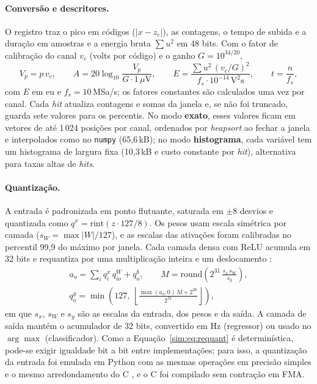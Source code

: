 \paragraph{Conversão e descritores.} O registro traz o pico em códigos (\(|x - z_c|\)), as contagens, o tempo de subida e a duração em amostras e a energia bruta \(\sum u^2\) em 48 bits. Com o fator de calibração do canal \(v_c\) (volts por código) e o ganho \(G = 10^{34/20}\),
\begin{equation}
	V_p = p\, v_c, \qquad
	A = 20 \log_{10}\frac{V_p}{G \cdot 1\,\mu\mathrm{V}}, \qquad
	E = \frac{\sum u^2\, (v_c/G)^2}{f_s \cdot 10^{-14}\,\mathrm{V^2 s}}, \qquad
	t = \frac{n}{f_s},
	\label{sim:eq:conversao}
\end{equation}
com \(E\) em eu e \(f_s = 10\,\)MSa/s; os fatores constantes são calculados uma vez por canal. Cada \textit{hit} atualiza contagens e somas da janela e, se não foi truncado, guarda sete valores para os percentis. No modo \textbf{exato}, esses valores ficam em vetores de até 1\,024 posições por canal, ordenados por \textit{heapsort} ao fechar a janela e interpolados como no \texttt{numpy} \cite{hyndman1996} (65,6\,kB); no modo \textbf{histograma}, cada variável tem um histograma de largura fixa (10,3\,kB e custo constante por \textit{hit}), alternativa para taxas altas de \textit{hits}.

\paragraph{Quantização.} A entrada é padronizada em ponto flutuante, saturada em \(\pm 8\) desvios e quantizada como \(q^x = \mathrm{rint}(z \cdot 127/8)\). Os pesos usam escala simétrica por camada (\(s_W = \max|W|/127\)), e as escalas das ativações foram calibradas no percentil 99,9 do máximo por janela. Cada camada densa com ReLU acumula em 32 bits e requantiza por uma multiplicação inteira e um deslocamento \cite{jacob2018,krishnamoorthi2018}:
\begin{equation}
	\begin{gathered}
		a_o = \sum_{i} q^{x}_{i}\, q^{W}_{io} + q^{b}_{o}, \qquad
		M = \mathrm{round}\!\left(2^{31}\,\frac{s_x\, s_W}{s_y}\right), \\
		q^{y}_{o} = \min\!\left(127,\ \left\lfloor \frac{\max(a_o, 0)\, M + 2^{30}}{2^{31}} \right\rfloor\right),
	\end{gathered}
	\label{sim:eq:requant}
\end{equation}
em que \(s_x\), \(s_W\) e \(s_y\) são as escalas da entrada, dos pesos e da saída. A camada de saída mantém o acumulador de 32 bits, convertido em Hz (regressor) ou usado no \(\arg\max\) (classificador). Como a Equação~\eqref{sim:eq:requant} é determinística, pode-se exigir igualdade bit a bit entre implementações; para isso, a quantização da entrada foi emulada em Python com as mesmas operações em precisão simples e o mesmo arredondamento do C \cite{goldberg1991,ieee754}, e o C foi compilado sem contração em FMA.

